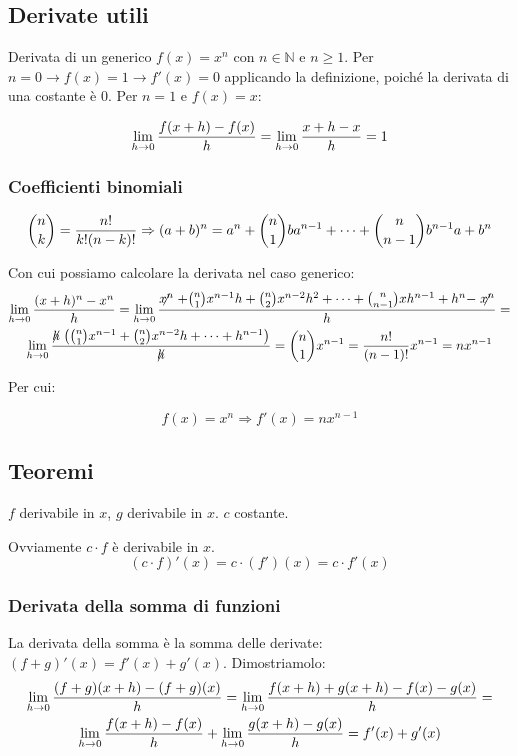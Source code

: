 \documentclass[12pt,a4paper]{article}
\begin{document}
\subsection{Derivate utili}	

Derivata di un generico $ f(x) = x^n $ con $n \in \mathbb{N}$ e $n \geq 1$.
Per $n = 0 \to f(x) = 1 \to f'(x) = 0$ applicando la definizione,
poich\'e la derivata di una costante \`e $0$. Per $n = 1 $ e $ f(x) = x$:

\[
\lim \limits_{h \to 0} {f(x+h) - f(x) \over h} =
\lim \limits_{h \to 0} {x + h - x \over h} = 1
\]

\subsubsection*{Coefficienti binomiali}

\[
{n \choose k} = {n! \over k!(n-k)!} \Rightarrow
(a+b)^n = a^n + {n \choose 1}  b a^{n-1} + \dots + {n \choose n-1} b^{n-1} a
+ b^n
\]

Con cui possiamo calcolare la derivata nel caso generico:
\begin{multline}	
\lim \limits_{h \to 0} {(x+h)^n - x^n \over h} = 
\lim \limits_{h \to 0} {\centernot{x^n} + {n \choose 1} x^{n-1}h + 
{n \choose 2} x^{n-2}h^2 + \dots + {n \choose n-1} x h^{n-1} + h^n -
\centernot{x^n} \over h} = \\
\lim \limits_{h \to 0} {\centernot h \left({n \choose 1} x^{n-1} +
{n \choose 2} x^{n-2}h + \dots + h^{n-1} \right) \over \centernot h} =
{n \choose 1} x^{n-1} = {n! \over (n-1)!} x^{n-1} = n x^{n-1}
\end{multline}

Per cui:

$$ f(x) = x^n \Rightarrow f'(x) = n x^{n-1}$$

\subsection{Teoremi}

$f$ derivabile in $x$, $g$ derivabile in $x$. $c$ costante.

Ovviamente $c \cdot f$ \`e derivabile in $x$.
\[
(c \cdot f)' (x) = c \cdot (f') (x) = c \cdot f' (x)
\]

\subsubsection{Derivata della somma di funzioni}
La derivata della somma \`e la somma delle derivate: $ (f + g)' (x) = 
f' (x) + g' (x) $. Dimostriamolo:
\begin{multline}	
\lim \limits_{h \to 0} {(f + g) (x + h) - (f + g) (x) \over h} = 
\lim \limits_{h \to 0} {f(x+h) + g(x+h) - f(x) - g(x) \over h} = \\
\lim \limits_{h \to 0} {f(x+h) - f(x) \over h} + 
\lim \limits_{h \to 0} {g(x+h) - g(x) \over h} =
f' (x) + g' (x)
\end{multline}
\end{document}
